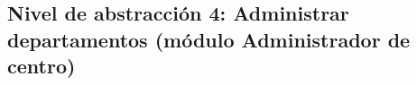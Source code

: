 \subsection{Nivel de abstracción 4: Administrar departamentos (módulo Administrador de centro)}



%
% 
%
%
% 
%
%
% 
%
%
% 